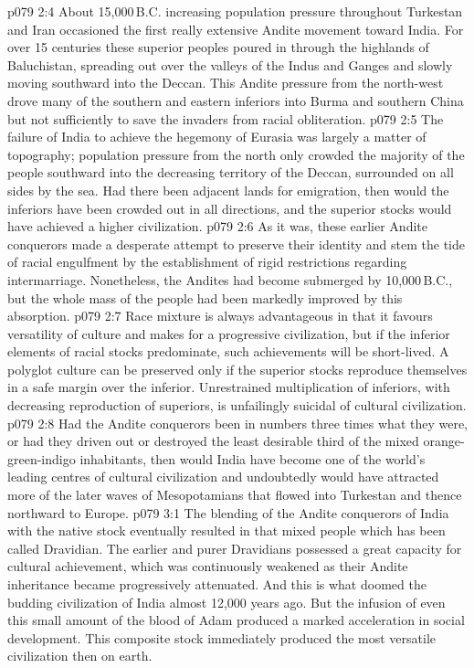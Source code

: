 \vs p079 2:4 \pc About 15,000\,B.C. increasing population pressure throughout Turkestan and Iran occasioned the first really extensive Andite movement toward India. For over 15 centuries these superior peoples poured in through the highlands of Baluchistan, spreading out over the valleys of the Indus and Ganges and slowly moving southward into the Deccan. This Andite pressure from the north\hyp{}west drove many of the southern and eastern inferiors into Burma and southern China but not sufficiently to save the invaders from racial obliteration.
\vs p079 2:5 The failure of India to achieve the hegemony of Eurasia was largely a matter of topography; population pressure from the north only crowded the majority of the people southward into the decreasing territory of the Deccan, surrounded on all sides by the sea. Had there been adjacent lands for emigration, then would the inferiors have been crowded out in all directions, and the superior stocks would have achieved a higher civilization.
\vs p079 2:6 As it was, these earlier Andite conquerors made a desperate attempt to preserve their identity and stem the tide of racial engulfment by the establishment of rigid restrictions regarding intermarriage. Nonetheless, the Andites had become submerged by 10,000\,B.C., but the whole mass of the people had been markedly improved by this absorption.
\vs p079 2:7 \pc Race mixture is always advantageous in that it favours versatility of culture and makes for a progressive civilization, but if the inferior elements of racial stocks predominate, such achievements will be short\hyp{}lived. A polyglot culture can be preserved only if the superior stocks reproduce themselves in a safe margin over the inferior. Unrestrained multiplication of inferiors, with decreasing reproduction of superiors, is unfailingly suicidal of cultural civilization.
\vs p079 2:8 Had the Andite conquerors been in numbers three times what they were, or had they driven out or destroyed the least desirable third of the mixed orange\hyp{}green\hyp{}indigo inhabitants, then would India have become one of the world’s leading centres of cultural civilization and undoubtedly would have attracted more of the later waves of Mesopotamians that flowed into Turkestan and thence northward to Europe.
\vs p079 3:1 The blending of the Andite conquerors of India with the native stock eventually resulted in that mixed people which has been called Dravidian. The earlier and purer Dravidians possessed a great capacity for cultural achievement, which was continuously weakened as their Andite inheritance became progressively attenuated. And this is what doomed the budding civilization of India almost 12,000 years ago. But the infusion of even this small amount of the blood of Adam produced a marked acceleration in social development. This composite stock immediately produced the most versatile civilization then on earth.
